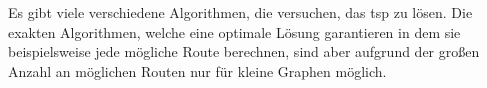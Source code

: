 \noindent Es gibt viele verschiedene Algorithmen, die versuchen, das \acs*{tsp} zu lösen.
Die exakten Algorithmen, welche eine optimale Lösung garantieren in dem sie beispielsweise jede mögliche Route berechnen, sind aber aufgrund der großen Anzahl an möglichen Routen nur für kleine Graphen möglich.


